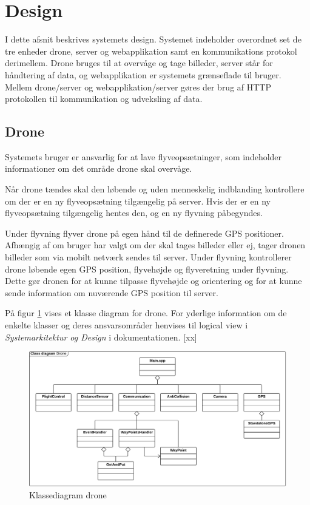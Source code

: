 \section{Design}

I dette afsnit beskrives systemets design. Systemet indeholder overordnet set de tre enheder drone, server og webapplikation samt en kommunikations protokol derimellem. Drone bruges til at overvåge og tage billeder, server står for håndtering af data, og webapplikation er systemets grænseflade til bruger. Mellem drone/server og webapplikation/server gøres der brug af HTTP protokollen til kommunikation og udveksling af data.



\subsection{Drone}

Systemets bruger er ansvarlig for at lave flyveopsætninger, som indeholder informationer om det område drone skal overvåge.

Når drone tændes skal den løbende og uden menneskelig indblanding kontrollere om der er en ny flyveopsætning tilgængelig på server. Hvis der er en ny flyveopsætning tilgængelig hentes den, og en ny flyvning påbegyndes. 

Under flyvning flyver drone på egen hånd til de definerede GPS positioner. Afhængig af om bruger har valgt om der skal tages billeder eller ej, tager dronen billeder som via mobilt netværk sendes til server. 
Under flyvning kontrollerer drone løbende egen GPS position, flyvehøjde og flyveretning under flyvning. Dette gør dronen for at kunne tilpasse flyvehøjde og orientering og for at kunne sende information om nuværende GPS position til server.

På figur \ref{fig:class_drone} vises et klasse diagram for drone. For yderlige information om de enkelte klasser og deres ansvarsområder henvises til logical view i \textit{Systemarkitektur og Design} i dokumentationen. [xx]


\begin{figure}[H]
\centering
\includegraphics[width=1\textwidth]{Billeder/Design_Class_drone.png}
\vspace{-0.5cm}
\caption{Klassediagram drone}
\label{fig:class_drone}
\end{figure}


